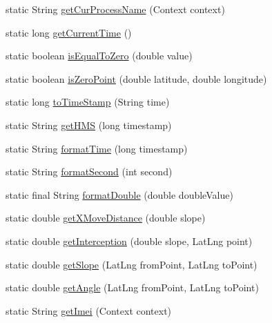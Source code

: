 \begin{DoxyCompactItemize}
\item 
static String \mbox{\hyperlink{classcom_1_1example_1_1akisame__lin_1_1love__air2_1_1trace_1_1_common_util_a069003ebc75acd99f5fd76e80b8bb966}{get\+Cur\+Process\+Name}} (Context context)
\item 
static long \mbox{\hyperlink{classcom_1_1example_1_1akisame__lin_1_1love__air2_1_1trace_1_1_common_util_a7abdf0dea67312159fa5ddf274531d37}{get\+Current\+Time}} ()
\item 
static boolean \mbox{\hyperlink{classcom_1_1example_1_1akisame__lin_1_1love__air2_1_1trace_1_1_common_util_a488fdf7a521ebccca47d21fc33c557af}{is\+Equal\+To\+Zero}} (double value)
\item 
static boolean \mbox{\hyperlink{classcom_1_1example_1_1akisame__lin_1_1love__air2_1_1trace_1_1_common_util_a90814909fcb9c44b6fa03bbab5c292d9}{is\+Zero\+Point}} (double latitude, double longitude)
\item 
static long \mbox{\hyperlink{classcom_1_1example_1_1akisame__lin_1_1love__air2_1_1trace_1_1_common_util_ade1a3030d3dbda975993ef568a52653c}{to\+Time\+Stamp}} (String time)
\item 
static String \mbox{\hyperlink{classcom_1_1example_1_1akisame__lin_1_1love__air2_1_1trace_1_1_common_util_afb313765d8a8c6a9cd89208b7f07e8ab}{get\+H\+MS}} (long timestamp)
\item 
static String \mbox{\hyperlink{classcom_1_1example_1_1akisame__lin_1_1love__air2_1_1trace_1_1_common_util_a691094d61c9ef35cf1d48044025cd534}{format\+Time}} (long timestamp)
\item 
static String \mbox{\hyperlink{classcom_1_1example_1_1akisame__lin_1_1love__air2_1_1trace_1_1_common_util_a034eb7b6c0d83233febb4c0108655227}{format\+Second}} (int second)
\item 
static final String \mbox{\hyperlink{classcom_1_1example_1_1akisame__lin_1_1love__air2_1_1trace_1_1_common_util_ac6c3d702391714401c86dfe92bbf2cc9}{format\+Double}} (double double\+Value)
\item 
static double \mbox{\hyperlink{classcom_1_1example_1_1akisame__lin_1_1love__air2_1_1trace_1_1_common_util_a473bd04933b5b1f4f18c877530bc016d}{get\+X\+Move\+Distance}} (double slope)
\item 
static double \mbox{\hyperlink{classcom_1_1example_1_1akisame__lin_1_1love__air2_1_1trace_1_1_common_util_ad5923364a6ae57bbe1e08404d12a73e7}{get\+Interception}} (double slope, Lat\+Lng point)
\item 
static double \mbox{\hyperlink{classcom_1_1example_1_1akisame__lin_1_1love__air2_1_1trace_1_1_common_util_a65042d3df996b59adb6e6fd0dc754873}{get\+Slope}} (Lat\+Lng from\+Point, Lat\+Lng to\+Point)
\item 
static double \mbox{\hyperlink{classcom_1_1example_1_1akisame__lin_1_1love__air2_1_1trace_1_1_common_util_ad567f66bb61f0b03588ff0bce7034b53}{get\+Angle}} (Lat\+Lng from\+Point, Lat\+Lng to\+Point)
\item 
static String \mbox{\hyperlink{classcom_1_1example_1_1akisame__lin_1_1love__air2_1_1trace_1_1_common_util_ab672677f30ba7716dfdd4c3b46ae8de3}{get\+Imei}} (Context context)
\end{DoxyCompactItemize}
